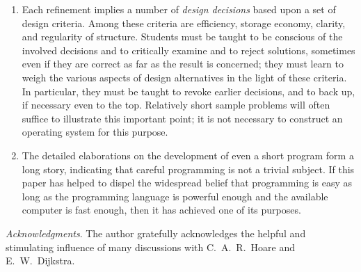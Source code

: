 \begin{enumerate}
    \item Each refinement implies a number of \emph{design decisions} based
          upon a set of design criteria.  Among these criteria are efficiency,
          storage economy, clarity, and regularity of structure. Students must
          be taught to be conscious of the involved decisions and to critically
          examine and to reject solutions, sometimes even if they are correct
          as far as the result is concerned; they must learn to weigh the
          various aspects of design alternatives in the light of these
          criteria.  In particular, they must be taught to revoke earlier
          decisions, and to back up, if necessary even to the top.  Relatively
          short sample problems will often suffice to illustrate this important
          point; it is not necessary to construct an operating system for this
          purpose.

    \item The detailed elaborations on the development of even a short program
          form a long story, indicating that careful programming is not a
          trivial subject.  If this paper has helped to dispel the widespread
          belief that programming is easy as long as the programming language
          is powerful enough and the available computer is fast enough, then it
          has achieved one of its purposes.
\end{enumerate}

\emph{Acknowledgments}.  The author gratefully acknowledges the helpful and
stimulating influence of many discussions with C.~A.~R.~Hoare and
E.~W.~Dijkstra.

\nocite{dijkstra1969}
\nocite{naur1969}
\nocite{wirth1970}
